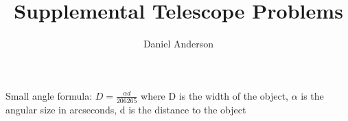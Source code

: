 \documentclass[11pt]{article}
\begin{document}
\author{Daniel Anderson}
\title{Supplemental Telescope Problems}
\maketitle

\begin{list}
    \item Small angle formula: $D = \frac{\alpha d}{206265}$ where D is the width of the object, $\alpha$ is the angular size in arcseconds, d is the distance to the object
\end{list}
\end{document}
